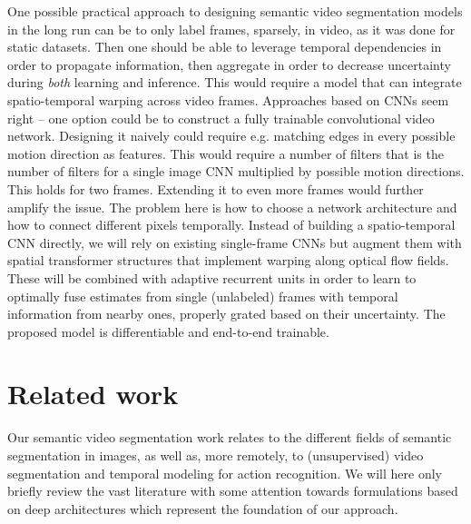 \documentclass[10pt,twocolumn,letterpaper]{article}
\begin{document}
One possible practical approach to designing semantic video segmentation models in the long run can be to only label frames, sparsely, in video, as it was done for static datasets\cite{everingham2015pascal,lin2014microsoft}.  Then one should be able to leverage temporal dependencies in order to propagate information, then aggregate in order to decrease uncertainty during \emph{both} learning and inference. This would require a model that can integrate spatio-temporal warping across video frames. Approaches based on CNNs seem right -- one option could be to construct a fully trainable convolutional video network. 
Designing it naively could require e.g. matching edges in every possible motion direction as features. This would require a number of filters that is the number of filters for a single image CNN multiplied by possible motion directions. This holds for two frames. Extending it to even more frames would further amplify the issue. The problem here is how to choose a network architecture and how to connect different pixels temporally. Instead of building a spatio-temporal CNN directly, we will rely on existing single-frame CNNs but augment them with spatial transformer structures that implement warping along optical flow fields. These will be combined with adaptive recurrent units in order to learn to optimally fuse estimates from single (unlabeled) frames with temporal information from nearby ones, properly grated based on their uncertainty. The proposed model is differentiable and end-to-end trainable. 



\section{Related work}

Our semantic video segmentation work relates to the different fields of semantic segmentation in images, as well as, more remotely, to (unsupervised) video segmentation and temporal modeling for action recognition. We will here only briefly review the vast literature with some attention towards formulations based on deep architectures which represent the foundation of our approach.
\end{document}
